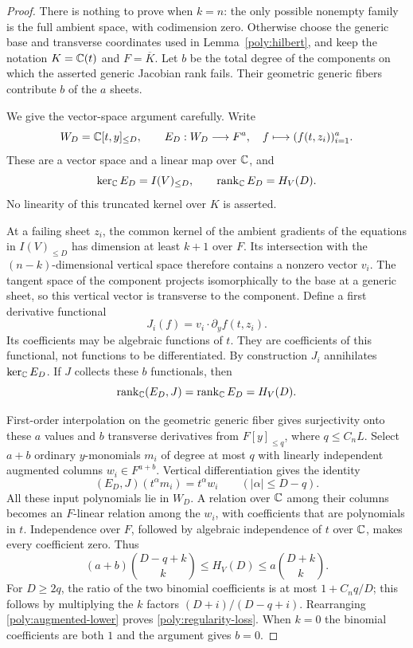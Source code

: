 \begin{proof}
There is nothing to prove when $k=n$: the only possible nonempty
family is the full ambient space, with codimension zero.  Otherwise
choose the generic base and transverse coordinates used in
Lemma~\ref{poly:hilbert}, and keep the notation $K=\mathbb C(t)$ and
$F=\overline K$.  Let $b$ be the total degree of the components on
which the asserted generic Jacobian rank fails.  Their geometric
generic fibers contribute $b$ of the $a$ sheets.

We give the vector-space argument carefully.  Write
\[
 W_D=\mathbb C[t,y]_{\le D},\qquad
 E_D:W_D\longrightarrow F^a,
       \quad f\longmapsto (f(t,z_i))_{i=1}^a.
\]
These are a vector space and a linear map over $\mathbb C$, and
\[
 \ker_{\mathbb C}E_D=I(V)_{\le D},\qquad
 \operatorname{rank}_{\mathbb C}E_D=H_V(D).
\]
No linearity of this truncated kernel over $K$ is asserted.

At a failing sheet $z_i$, the common kernel of the ambient gradients
of the equations in $I(V)_{\le D}$ has dimension at least $k+1$ over
$F$.  Its intersection with the $(n-k)$-dimensional vertical space
therefore contains a nonzero vector $v_i$.  The tangent space of
the component projects isomorphically to the base at a generic
sheet, so this vertical vector is transverse to the component.
Define a first derivative functional
\[
 J_i(f)=v_i\mathbin{\cdot}\partial_yf(t,z_i).
\]
Its coefficients may be algebraic functions of $t$.  They are
coefficients of this functional, not functions to be differentiated.
By construction $J_i$ annihilates $\ker_{\mathbb C}E_D$.  If $J$ collects
these $b$ functionals, then
\begin{equation}\label{poly:jet-factorization}
 \operatorname{rank}_{\mathbb C}(E_D,J)=\operatorname{rank}_{\mathbb C}E_D=H_V(D).
\end{equation}

First-order interpolation on the geometric generic fiber gives
surjectivity onto these $a$ values and $b$ transverse derivatives
from $F[y]_{\le q}$, where $q\le C_nL$.  Select $a+b$ ordinary
$y$-monomials $m_i$ of degree at most $q$ with linearly independent
augmented columns $w_i\in F^{a+b}$.  Vertical differentiation gives
the identity
\[
 (E_D,J)(t^\alpha m_i)=t^\alpha w_i
       \qquad(|\alpha|\le D-q).
\]
All these input polynomials lie in $W_D$.  A relation over $\mathbb C$
among their columns becomes an $F$-linear relation among the $w_i$,
with coefficients that are polynomials in $t$.  Independence over
$F$, followed by algebraic independence of $t$ over $\mathbb C$, makes
every coefficient zero.  Thus
\begin{equation}\label{poly:augmented-lower}
 (a+b)\binom{D-q+k}{k}\le H_V(D)
                  \le a\binom{D+k}{k}.
\end{equation}
For $D\ge2q$, the ratio of the two binomial coefficients is at most
$1+C_nq/D$; this follows by multiplying the $k$ factors
$(D+i)/(D-q+i)$.  Rearranging \eqref{poly:augmented-lower} proves
\eqref{poly:regularity-loss}.  When $k=0$ the binomial coefficients
are both $1$ and the argument gives $b=0$.


\end{proof}
